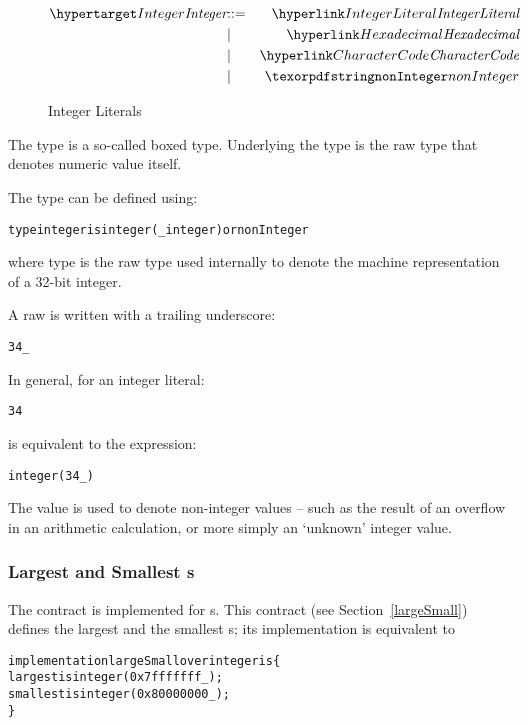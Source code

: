 \begin{figure}[htbp]
\begin{eqnarray*}
\ntDef{Integer}&\arrow&\ntRef{IntegerLiteral}\\
&\choice&\ntRef{Hexadecimal}\\
&\choice&\ntRef{CharacterCode}\\
&\choice&\q{nonInteger}
\end{eqnarray*}
\caption{Integer Literals}
\label{integerExpressionFig}
\end{figure}

\noindent
The  type is a so-called boxed type. Underlying the  type is the raw type that denotes numeric value itself. 

The  type can be defined using:
\begin{alltt}
type integer is integer(_integer) or nonInteger
\end{alltt}
where  type is the raw type used internally to denote the machine representation of a 32-bit integer.
\label{rawInteger}
\begin{aside}
A raw  is written with a trailing underscore:
\begin{alltt}
34\_
\end{alltt}
In general, for an integer literal:
\begin{alltt}
34
\end{alltt}
is equivalent to the expression:
\begin{alltt}
integer(34\_)
\end{alltt}
\end{aside}
The  value is used to denote non-integer  values -- such as the result of an overflow in an arithmetic calculation, or more simply an `unknown' integer value.

\subsubsection{Largest and Smallest s}
The  contract is implemented for s. This contract (see Section~\vref{largeSmall}) defines the largest and the smallest s; its implementation is equivalent to
\begin{alltt}
implementation largeSmall over integer is \{
  largest is integer(0x7fffffff\_);
  smallest is integer(0x80000000\_);
\}
\end{alltt}

